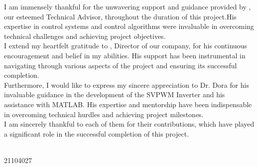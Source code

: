 I am immensely thankful for the unwavering support and guidance provided by
\industry, our esteemed Technical Advisor, throughout the duration of this
project.His expertise in control systems and control algorithms were invaluable
in overcoming technical challenges and achieving project objectives.\\

I extend my heartfelt gratitude to \director, Director of our company, for his
continuous encouragement and belief in my abilities. His support has been
instrumental in navigating through various aspects of the project and ensuring
its successful completion.\\

Furthermore, I would like to express my sincere appreciation to Dr. Dora for his
invaluable guidance in the development of the SVPWM Inverter and his assistance
with MATLAB. His expertise and mentorship have been indispensable in overcoming
technical hurdles and achieving project milestones.\\

I am sincerely thankful to each of them for their contributions, which have
played a significant role in the successful completion of this project.

\vfill
\begin{minipage}[t]{1\textwidth}
    \raggedleft
    \name \\ 21104027
\end{minipage}